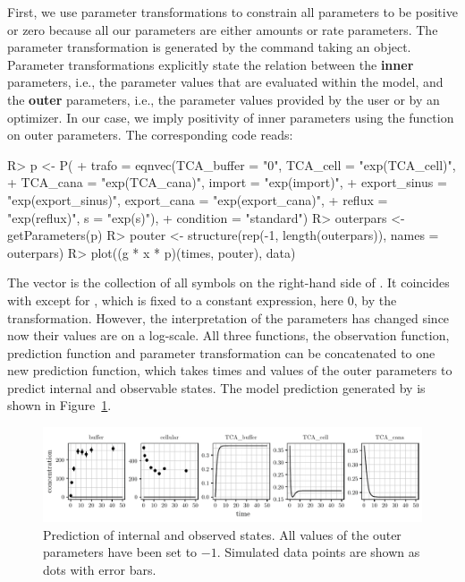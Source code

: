 \documentclass[article]{jss}
\begin{document}
First, we use parameter transformations to constrain all parameters to be positive or zero because all our parameters are either amounts or rate parameters. The parameter transformation is generated by the  command taking an  object. Parameter transformations explicitly state the relation between the \textbf{inner} parameters, i.e., the parameter values that are evaluated within the model, and the \textbf{outer} parameters, i.e., the parameter values provided by the user or by an optimizer. In our case, we imply positivity of inner parameters using the  function on outer parameters.
The corresponding code reads:
\begin{CodeChunk}
\begin{CodeInput}
R> p <- P(
+    trafo = eqnvec(TCA_buffer = "0", TCA_cell = "exp(TCA_cell)",
+      TCA_cana = "exp(TCA_cana)", import = "exp(import)",
+      export_sinus = "exp(export_sinus)", export_cana = "exp(export_cana)",
+      reflux = "exp(reflux)", s = "exp(s)"),
+   condition = "standard")
R> outerpars <- getParameters(p)
R> pouter <- structure(rep(-1, length(outerpars)), names = outerpars)
R> plot((g * x * p)(times, pouter), data)
\end{CodeInput}
\end{CodeChunk}
%
The vector  is the collection of all symbols on the right-hand side of . It coincides with  except for , which is fixed to a constant expression, here 0, by the transformation. However, the interpretation of the parameters has changed since now their values are on a log-scale. All three functions, the observation function, prediction function and parameter transformation can be concatenated to one new prediction function,  which takes times and values of the outer parameters to predict internal and observable states. The model prediction generated by  is shown in Figure~\ref{fig:gxp}.

\begin{figure}[t!]
\centering
\includegraphics[width = \textwidth]{Figures/figure3}
\caption{Prediction of internal and observed states. All values of the outer parameters have been set to $-1$. Simulated data points are shown as dots with error bars.\label{fig:gxp}}
\end{figure}
\end{document}
